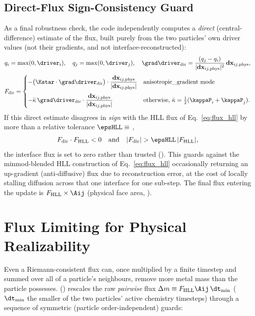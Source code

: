 \subsection{Direct-Flux Sign-Consistency Guard}
\label{sec:anti-diffusion-guard}
As a final robustness check, the code independently computes a
\emph{direct} (central-difference) estimate of the flux, built purely
from the two particles' own driver values (not their gradients, and not
interface-reconstructed):
\begin{equation}
  q_i = \max(0,\driver_i) , \quad q_j=\max(0,\driver_j) , \quad
  \grad\driver_{\rm dir} = \frac{(q_j-q_i)}{|\mathbf{dx}_{ij,\rm phys}|^2}\,\mathbf{dx}_{ij,\rm phys} ,
\end{equation}
\begin{equation}
  F_{\rm dir} =
  \begin{cases}
    -\big(\Kstar\cdot\grad\driver_{\rm dir}\big)\cdot \dfrac{\mathbf{dx}_{ij,\rm phys}}{|\mathbf{dx}_{ij,\rm phys}|}
      & \text{anisotropic\_gradient mode} \\[1.2em]
    -\bar\kappa\, \grad\driver_{\rm dir}\cdot \dfrac{\mathbf{dx}_{ij,\rm phys}}{|\mathbf{dx}_{ij,\rm phys}|}
      & \text{otherwise, } \bar\kappa=\tfrac12(\kappaP_i+\kappaP_j) .
  \end{cases}
\end{equation}
If this direct estimate disagrees in \emph{sign} with the HLL flux of
Eq.~\eqref{eq:flux_hll} by more than a relative tolerance
$\epsHLL \equiv$ ,
\begin{equation}
  F_{\rm dir}\cdot F_{\rm HLL} < 0
  \quad\text{and}\quad
  |F_{\rm dir}| > \epsHLL\, |F_{\rm HLL}| ,
\end{equation}
the interface flux is set to zero rather than trusted
(). This guards against
the minmod-blended HLL construction of Eq.~\eqref{eq:flux_hll}
occasionally returning an up-gradient (anti-diffusive) flux due to
reconstruction error, at the cost of locally stalling diffusion across
that one interface for one sub-step. The final flux entering the update
is $F_{\rm HLL}\times\Aij$ (physical face area,
).

\section{Flux Limiting for Physical Realizability}
\label{sec:flux-limiter}

Even a Riemann-consistent flux can, once multiplied by a finite timestep
and summed over all of a particle's neighbours, remove more metal mass
than the particle possesses. 
() rescales the raw \emph{pairwise} flux
$\Delta m \equiv F_{\rm HLL}\Aij\, \dt_{\min}$ ($\dt_{\min}$ the smaller
of the two particles' active chemistry timesteps) through a sequence of
symmetric (particle order-independent) guards:

